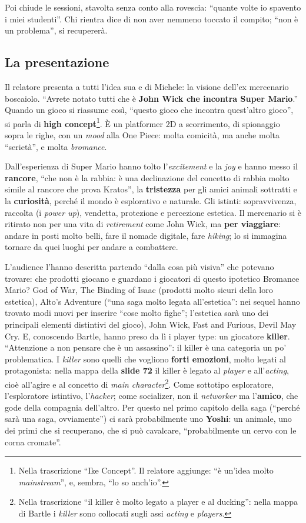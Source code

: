 Poi chiude le sessioni, stavolta senza conto alla rovescia: ``quante volte io
spavento i miei studenti''. Chi rientra dice di non aver nemmeno toccato il
compito; ``non è un problema'', si recupererà.

\subsection{La presentazione}

Il relatore presenta a tutti l'idea sua e di Michele: la visione dell'ex
mercenario boscaiolo. ``Avrete notato tutti che è \textbf{John Wick che incontra
Super Mario}.'' Quando un gioco si riassume così, ``questo gioco che incontra
quest'altro gioco'', si parla di \textbf{high concept}\footnote{Nella trascrizione
``Ike Concept''. Il relatore aggiunge: ``è un'idea molto \emph{mainstream}'', e,
sembra, ``lo so anch'io''.}. È un platformer 2D a scorrimento, di spionaggio sopra
le righe, con un \emph{mood} alla One Piece: molta comicità, ma anche molta
``serietà'', e molta \emph{bromance}.

Dall'esperienza di Super Mario hanno tolto l'\emph{excitement} e la \emph{joy} e
hanno messo il \textbf{rancore}, ``che non è la rabbia: è una declinazione del
concetto di rabbia molto simile al rancore che prova Kratos'', la
\textbf{tristezza} per gli amici animali sottratti e la \textbf{curiosità}, perché
il mondo è esplorativo e naturale. Gli istinti: sopravvivenza, raccolta (i
\emph{power up}), vendetta, protezione e percezione estetica. Il mercenario si è
ritirato non per una vita di \emph{retirement} come John Wick, ma \textbf{per
viaggiare}: andare in posti molto belli, fare il nomade digitale, fare
\emph{hiking}; lo si immagina tornare da quei luoghi per andare a combattere.

L'audience l'hanno descritta partendo ``dalla cosa più visiva'' che potevano
trovare: che prodotti giocano e guardano i giocatori di questo ipotetico Bromance
Mario? God of War, The Binding of Isaac (prodotti molto sicuri della loro
estetica), Alto's Adventure (``una saga molto legata all'estetica'': nei sequel
hanno trovato modi nuovi per inserire ``cose molto fighe''; l'estetica sarà uno
dei principali elementi distintivi del gioco), John Wick, Fast and Furious, Devil
May Cry. E, conoscendo Bartle, hanno preso da lì i player type: un giocatore
\textbf{killer}. ``Attenzione a non pensare che è un assassino'': il killer è una
categoria un po' problematica. I \emph{killer} sono quelli che vogliono
\textbf{forti emozioni}, molto legati al protagonista: nella mappa della
\textbf{slide 72} il killer è legato al \emph{player} e all'\emph{acting}, cioè
all'agire e al concetto di \emph{main character}\footnote{Nella trascrizione ``il
killer è molto legato a player e al ducking'': nella mappa di Bartle i
\emph{killer} sono collocati sugli assi \emph{acting} e \emph{players}.}. Come
sottotipo esploratore, l'esploratore istintivo, l'\emph{hacker}; come socializer,
non il \emph{networker} ma l'\textbf{amico}, che gode della compagnia dell'altro.
Per questo nel primo capitolo della saga (``perché sarà una saga, ovviamente'')
ci sarà probabilmente uno \textbf{Yoshi}: un animale, uno dei primi che si
recuperano, che si può cavalcare, ``probabilmente un cervo con le corna
cromate''.

